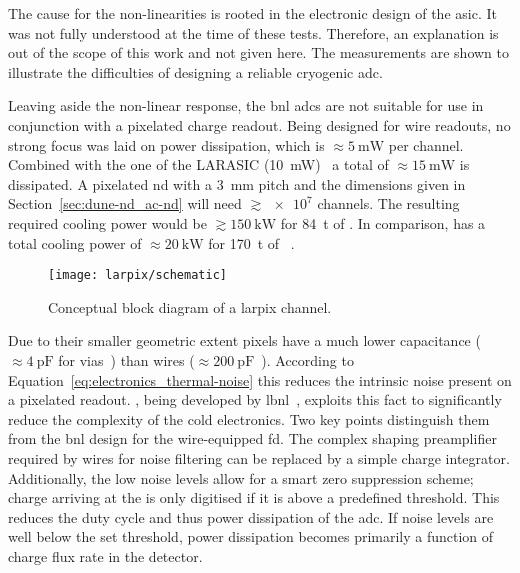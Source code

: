 The cause for the non-linearities is rooted in the electronic design of the \gls{asic}.
It was not fully understood at the time of these tests.
Therefore, an explanation is out of the scope of this work and not given here.
The measurements are shown to illustrate the difficulties of designing a reliable cryogenic \gls{adc}.

Leaving aside the non-linear response, the \gls{bnl} \glspl{adc} are not suitable for use in conjunction with a pixelated \lartpc{} charge readout.
Being designed for wire readouts, no strong focus was laid on power dissipation, which is $\approx \SI{5}{\milli\watt}$ per channel.
Combined with the one of the LARASIC (\SI{10}{\milli\watt})~\cite{larasic} a total of $\approx \SI{15}{\milli\watt}$ is dissipated.
A pixelated \dune{} \gls{nd} with a \SI{3}{\milli\metre} pitch and the dimensions given in Section~\ref{sec:dune-nd_ac-nd} will need $\gtrsim {\num{e7}}$ channels.
The resulting required cooling power would be $\gtrsim \SI{150}{\kilo\watt}$ for \SI{84}{\tonne} of \lar{}.
In comparison, \uboone{} has a total cooling power of $\approx \SI{20}{\kilo\watt}$ for \SI{170}{\tonne} of \lar{}~\cite{uboone}.

\begin{figure}[tbp]
	\centering
	\texttt{[image: larpix/schematic]}
	\caption[ block diagram]{%
		Conceptual block diagram of a \acrshort{larpix} channel.~\cite{dan_larpix_arcCM}
	}
	\label{fig:larpix_schematic}
\end{figure}

Due to their smaller geometric extent pixels have a much lower capacitance ($\approx \SI{4}{\pico\farad}$ for vias~\cite{larpix_spec}) than wires ($\approx \SI{200}{\pico\farad}$~\cite{protodune-sp}).
According to Equation~\eqref{eq:electronics_thermal-noise} this reduces the intrinsic noise present on a pixelated readout.
\larpix{}, being developed by \gls{lbnl}~\cite{larpix, larpix_spec}, exploits this fact to significantly reduce the complexity of the cold electronics.
Two key points distinguish them from the \gls{bnl} design for the wire-equipped \gls{fd}.
The complex shaping preamplifier required by wires for noise filtering can be replaced by a simple charge integrator.
Additionally, the low noise levels allow for a smart zero suppression scheme; charge arriving at the \larpix{} is only digitised if it is above a predefined threshold.
This reduces the duty cycle and thus power dissipation of the \gls{adc}.
If noise levels are well below the set threshold, power dissipation becomes primarily a function of charge flux rate in the detector.

